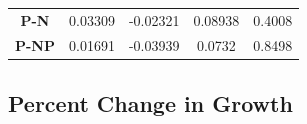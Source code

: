 \documentclass[]{article}
\begin{document}
\begin{longtable}[]{@{}ccccc@{}}
\begin{minipage}[t]{0.13\columnwidth}
\textbf{P-N}
\strut\end{minipage} &
\begin{minipage}[t]{0.14\columnwidth}\centering\strut
0.03309
\strut\end{minipage} &
\begin{minipage}[t]{0.16\columnwidth}\centering\strut
-0.02321
\strut\end{minipage} &
\begin{minipage}[t]{0.13\columnwidth}\centering\strut
0.08938
\strut\end{minipage} &
\begin{minipage}[t]{0.13\columnwidth}\centering\strut
0.4008
\strut\end{minipage}\tabularnewline
\begin{minipage}[t]{0.13\columnwidth}\centering\strut
\textbf{P-NP}
\strut\end{minipage} &
\begin{minipage}[t]{0.14\columnwidth}\centering\strut
0.01691
\strut\end{minipage} &
\begin{minipage}[t]{0.16\columnwidth}\centering\strut
-0.03939
\strut\end{minipage} &
\begin{minipage}[t]{0.13\columnwidth}\centering\strut
0.0732
\strut\end{minipage} &
\begin{minipage}[t]{0.13\columnwidth}\centering\strut
0.8498
\strut\end{minipage}\tabularnewline
\bottomrule
\end{longtable}

\newpage

\subsection{Percent Change in Growth}\label{percent-change-in-growth}
\end{document}
